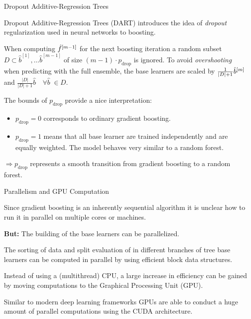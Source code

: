 \begin{vbframe}{Dropout Additive-Regression Trees}

  Dropout Additive-Regression Trees (DART) introduces the idea of \emph{dropout} regularization used in neural networks to boosting.

  \lz

  When computing $\hat{f}^{[m-1]}$ for the next boosting iteration a random subset $D \subset \hat{b}^{[1]}, \dots \hat{b}^{[m-1]}$ of size $(m-1) \cdot p_\text{drop}$ is ignored.
  To avoid \emph{overshooting} when predicting with the full ensemble, the base learners are scaled by $\frac{1}{|D| + 1}\hat{b}^{[m]}$ and $\frac{|D|}{|D| + 1}\hat{b}\quad \forall \hat{b}\;\in D$.

  \lz

  The bounds of $p_\text{drop}$ provide a nice interpretation:
  \begin{itemize}
    \item $p_\text{drop}=0$ corresponds to ordinary gradient boosting.
    \item $p_\text{drop}=1$ means that all base learner are trained independently and are equally weighted. The model behaves very similar to a random forest.
  \end{itemize}
  $\Rightarrow p_\text{drop}$ represents a smooth transition from gradient boosting to a random forest.



\end{vbframe}


\begin{vbframe}{Parallelism and GPU Computation}

Since gradient boosting is an inherently sequential algorithm it is unclear how to run it in parallel on multiple cores or machines.

\lz

\textbf{But:} The building of the base learners can be parallelized.

\lz

The sorting of data and split evaluation of in different branches of tree base learners can be computed in parallel by using efficient block data structures.

\lz

Instead of using a (multithread) CPU, a large increase in efficiency can be gained by moving computations to the Graphical Processing Unit (GPU).

\lz

Similar to modern deep learning frameworks GPUs are able to conduct a huge amount of parallel computations using the CUDA architecture.


\end{vbframe}

